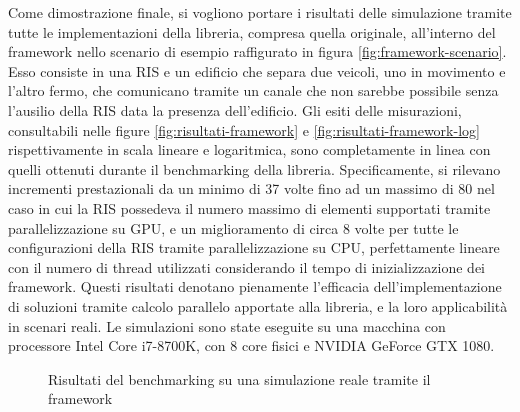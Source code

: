 Come dimostrazione finale, si vogliono portare i risultati delle simulazione
tramite tutte le implementazioni della libreria, compresa quella originale, all'interno
del framework nello scenario di esempio raffigurato in figura
\ref{fig:framework-scenario}. Esso consiste in una RIS e un edificio che separa due
veicoli, uno in movimento e l'altro fermo, che comunicano tramite un canale che non
sarebbe possibile senza l'ausilio della RIS data la presenza dell'edificio. Gli
esiti delle misurazioni, consultabili nelle figure \ref{fig:risultati-framework}
e \ref{fig:risultati-framework-log} rispettivamente in scala lineare e logaritmica,
sono completamente in linea con quelli ottenuti durante il benchmarking della
libreria. Specificamente, si rilevano incrementi prestazionali da un minimo di
37 volte fino ad un massimo di 80 nel caso in cui la RIS possedeva il numero
massimo di elementi supportati tramite parallelizzazione su GPU, e un miglioramento
di circa 8 volte per tutte le configurazioni della RIS tramite parallelizzazione
su CPU, perfettamente lineare con il numero di thread utilizzati considerando il
tempo di inizializzazione dei framework. Questi risultati denotano pienamente l'efficacia
dell'implementazione di soluzioni tramite calcolo parallelo apportate alla libreria,
e la loro applicabilità in scenari reali. Le simulazioni sono state eseguite su una
macchina con processore Intel Core i7-8700K, con 8 core fisici e NVIDIA GeForce
GTX 1080.

\begin{figure}[!ht]
  \centering
  \caption{Risultati del benchmarking su una simulazione reale tramite il
  framework}
\end{figure}